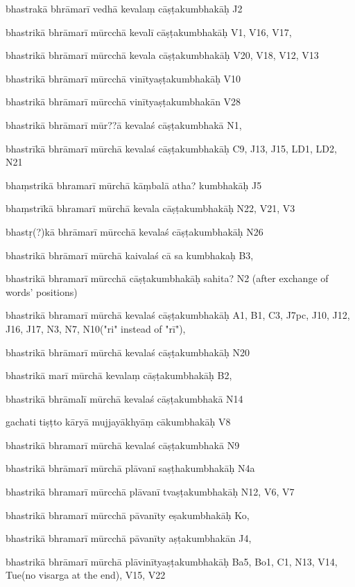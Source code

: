 \begin{ekdosis}
\begin{marma}[hp01_055]
\begin{marma}[hp02_009]
\begin{marma}[hp02_011]
\begin{marma}[hp02_44cd]
\item[bhastrakā bhrāmarī vedhā kevalaṃ cāṣṭakumbhakāḥ] J2
\item[bhastrikā bhrāmarī mūrcchā kevalī cāṣṭakumbhakāḥ] V1, V16, V17, 
\item[bhastrikā bhrāmarī mūrcchā kevala cāṣṭakumbhakāḥ] V20, V18, V12, V13
\item[bhastrikā bhrāmarī mūrcchā vinītyaṣṭakumbhakāḥ] V10
\item[bhastrikā bhrāmarī mūrcchā vinītyaṣṭakumbhakān] V28
\item[bhastrikā bhrāmarī mūr??ā kevalaś cāṣṭakumbhakā] N1,
\item[bhastrīkā bhrāmarī mūrchā kevalaś cāṣṭakumbhakāḥ] C9, J13, J15, LD1, LD2, N21
\item[bhaṃstrikā bhramarī mūrchā kāṃbalā atha? kumbhakāḥ] J5
\item[bhaṃstrīkā bhramarī mūrchā kevala cāṣṭakumbhakāḥ] N22, V21, V3
\item[bhastṛ(?)kā bhrāmarī mūrcchā kevalaś cāṣṭakumbhakāḥ] N26
\item[bhastrikā bhrāmarī mūrchā kaivalaś cā sa kumbhakaḥ] B3,
\item[bhastrikā bhramarī mūrcchā cāṣṭakumbhakāḥ sahita?] N2 (after exchange of words' positions)
\item[bhastrikā bhramarī mūrchā kevalaś cāṣṭakumbhakāḥ] A1, B1, C3, J7pc, J10, J12, J16, J17, N3, N7, N10("ri" instead of "rī"),
\item[bhastrikā bhrāmarī mūrchā kevalaś cāṣṭakumbhakāḥ] N20
\item[bhastrikā marī mūrchā kevalaṃ cāṣṭakumbhakāḥ] B2,
\item[bhastrikā bhrāmalī mūrchā kevalaś cāṣṭakumbhakā] N14
\item[gachati tiṣṭto kāryā mujjayākhyāṃ cākumbhakāḥ] V8
\item[bhastrikā bhramarī mūrchā kevalaś cāṣṭakumbhakā] N9
\item[bhastrikā bhrāmarī mūrchā plāvanī saṣṭhakumbhakāḥ] N4a
\item[bhastrikā bhramarī mūrcchā plāvanī tvaṣṭakumbhakāḥ] N12, V6, V7
\item[bhastrikā bhramarī mūrcchā pāvanīty eṣakumbhakāḥ] Ko,
\item[bhastrikā bhramarī mūrcchā pāvanīty aṣṭakumbhakān] J4,
\item[bhastrikā bhrāmarī mūrchā plāvinītyaṣṭakumbhakāḥ] Ba5, Bo1, C1, N13, V14, Tue(no visarga at the end), V15, V22

\end{marma}
\end{marma}
\end{marma}
\end{marma}
\end{ekdosis}
